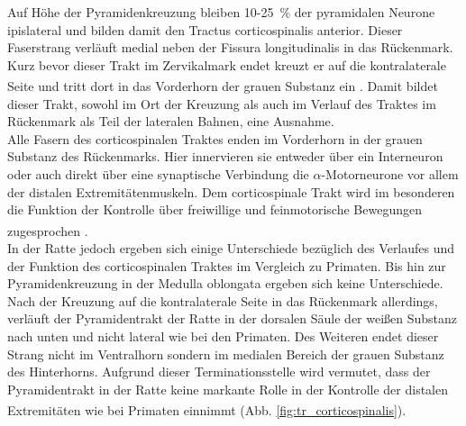 \documentclass[12pt,a4paper,pdftex]{article}
\begin{document}
Auf Höhe der Pyramidenkreuzung bleiben 10-25~\% der pyramidalen Neurone ipislateral und bilden damit den Tractus corticospinalis anterior. Dieser Faserstrang verläuft medial neben der Fissura longitudinalis in das  Rückenmark. Kurz bevor dieser Trakt im Zervikalmark endet kreuzt er auf die kontralaterale Seite und tritt dort in das Vorderhorn der grauen Substanz ein \textsuperscript{\cite[3]{trepel2011neuroanatomie}}. Damit bildet dieser Trakt, sowohl im Ort der Kreuzung als auch im Verlauf des Traktes im Rückenmark als Teil der lateralen Bahnen, eine Ausnahme. \\
Alle Fasern des corticospinalen Traktes enden im Vorderhorn in der grauen Substanz des Rückenmarks. Hier innervieren sie entweder über ein Interneuron oder auch direkt über eine synaptische Verbindung die $\alpha$-Motorneurone vor allem der distalen Extremitätenmuskeln. Dem corticospinale Trakt wird im besonderen die Funktion der Kontrolle über freiwillige und feinmotorische Bewegungen zugesprochen \textsuperscript{\cite[3]{trepel2011neuroanatomie}}. \\
In der Ratte jedoch ergeben sich einige Unterschiede bezüglich des Verlaufes und der Funktion des corticospinalen Traktes im Vergleich zu Primaten. Bis hin zur Pyramidenkreuzung in der Medulla oblongata ergeben sich keine Unterschiede. Nach der Kreuzung auf die kontralaterale Seite in das Rückenmark allerdings, verläuft der Pyramidentrakt der Ratte in der dorsalen Säule der weißen Substanz nach unten und nicht lateral wie bei den Primaten. Des Weiteren endet dieser Strang nicht im Ventralhorn sondern im medialen Bereich der grauen Substanz des Hinterhorns. Aufgrund dieser Terminationsstelle wird vermutet, dass der Pyramidentrakt in der Ratte keine markante Rolle in der Kontrolle der distalen Extremitäten wie bei Primaten einnimmt \textsuperscript{\cite[8]{paxinos2014rat}} (Abb. \ref{fig:tr_corticospinalis}).  
\end{document}
